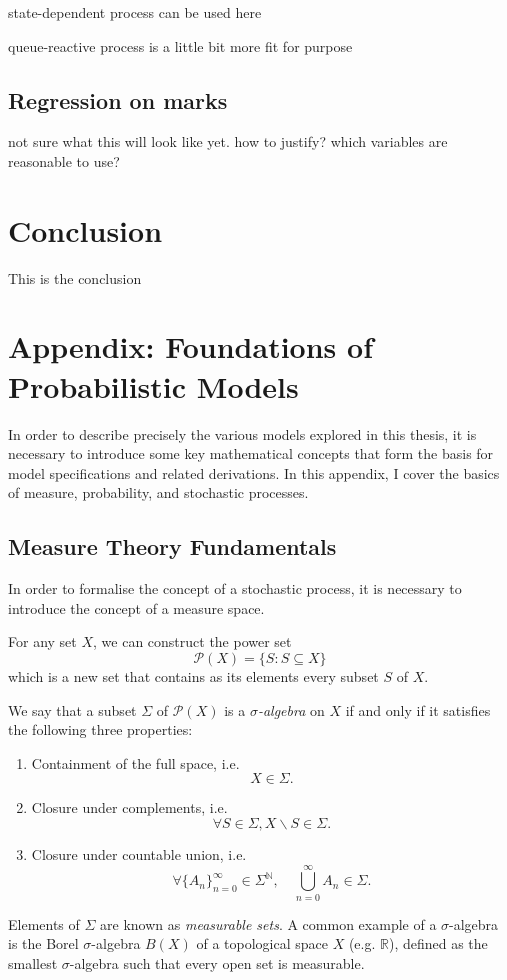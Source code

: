 \documentclass[honours,12pt]{unswthesis}
\numberwithin{equation}{section}
\begin{document}
state-dependent process can be used here

queue-reactive process is a little bit more fit for purpose

\section{Regression on marks}
not sure what this will look like yet. how to justify? which variables are reasonable to use?


\chapter{Conclusion}\label{ccl}


This is the conclusion


\chapter{Appendix: Foundations of Probabilistic Models}
In order to describe precisely the various models explored in this thesis, it is necessary to introduce some key mathematical concepts that form the basis for model specifications and related derivations. In this appendix, I cover the basics of measure, probability, and stochastic processes.

\section{Measure Theory Fundamentals}
In order to formalise the concept of a stochastic process, it is necessary to introduce the concept of a measure space.

For any set $X$, we can construct the power set
$$\mathcal{P}(X) = \{S : S\subseteq X\}$$
which is a new set that contains as its elements every subset $S$ of $X$.

We say that a subset $\Sigma$ of $\mathcal{P}(X)$ is a  \textit{$\sigma$-algebra} on $X$ if and only if it satisfies the following three properties:
\begin{enumerate}
	\item Containment of the full space, i.e. $$X\in\Sigma.$$
	\item Closure under complements, i.e. $$\forall S \in \Sigma, X\backslash S\in\Sigma.$$
	\item Closure under countable union, i.e. $$\forall \{A_n\}_{n=0}^\infty\in\Sigma^{\mathbb{N}},\quad\bigcup_{n=0}^\infty A_n \in \Sigma.$$
\end{enumerate}
Elements of $\Sigma$ are known as \textit{measurable sets}. A common example of a $\sigma$-algebra is the Borel $\sigma$-algebra $B(X)$ of a topological space $X$ (e.g. $\mathbb{R}$), defined as the smallest $\sigma$-algebra such that every open set is measurable.
\end{document}
